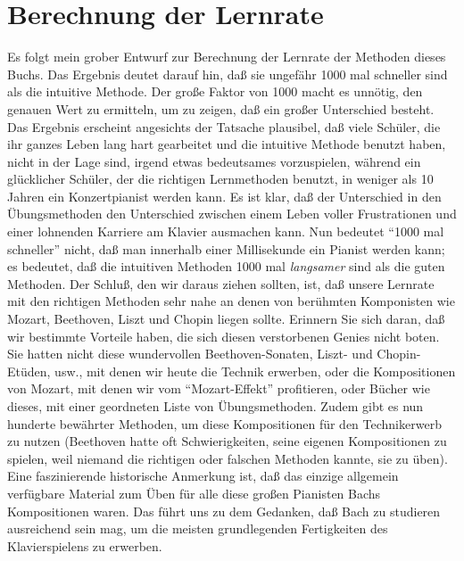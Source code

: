 
\section{Berechnung der Lernrate}\hypertarget{c1iv5}{}

Es folgt mein grober Entwurf zur Berechnung der Lernrate der Methoden dieses Buchs.
Das Ergebnis deutet darauf hin, daß sie ungefähr 1000 mal schneller sind als die intuitive Methode.
Der große Faktor von 1000 macht es unnötig, den genauen Wert zu ermitteln, um zu zeigen, daß ein großer Unterschied besteht.
Das Ergebnis erscheint angesichts der Tatsache plausibel, daß viele Schüler, die ihr ganzes Leben lang hart gearbeitet und die intuitive Methode benutzt haben, nicht in der Lage sind, irgend etwas bedeutsames vorzuspielen, während ein glücklicher Schüler, der die richtigen Lernmethoden benutzt, in weniger als 10 Jahren ein Konzertpianist werden kann.
Es ist klar, daß der Unterschied in den Übungsmethoden den Unterschied zwischen einem Leben voller Frustrationen und einer lohnenden Karriere am Klavier ausmachen kann.
Nun bedeutet \enquote{1000 mal schneller} nicht, daß man innerhalb einer Millisekunde ein Pianist werden kann; es bedeutet, daß die intuitiven Methoden 1000 mal \textit{langsamer} sind als die guten Methoden.
Der Schluß, den wir daraus ziehen sollten, ist, daß unsere Lernrate mit den richtigen Methoden sehr nahe an denen von berühmten Komponisten wie Mozart, Beethoven, Liszt und Chopin liegen sollte.
Erinnern Sie sich daran, daß wir bestimmte Vorteile haben, die sich diesen verstorbenen Genies nicht boten.
Sie hatten nicht diese wundervollen Beethoven-Sonaten, Liszt- und Chopin-Etüden, usw., mit denen wir heute die Technik erwerben, oder die Kompositionen von Mozart, mit denen wir vom \enquote{Mozart-Effekt} profitieren, oder Bücher wie dieses, mit einer geordneten Liste von Übungsmethoden.
Zudem gibt es nun hunderte bewährter Methoden, um diese Kompositionen für den Technikerwerb zu nutzen (Beethoven hatte oft Schwierigkeiten, seine eigenen Kompositionen zu spielen, weil niemand die richtigen oder falschen Methoden kannte, sie zu üben).
Eine faszinierende historische Anmerkung ist, daß das einzige allgemein verfügbare Material zum Üben für alle diese großen Pianisten Bachs Kompositionen waren.
Das führt uns zu dem Gedanken, daß Bach zu studieren ausreichend sein mag, um die meisten grundlegenden Fertigkeiten des Klavierspielens zu erwerben.

